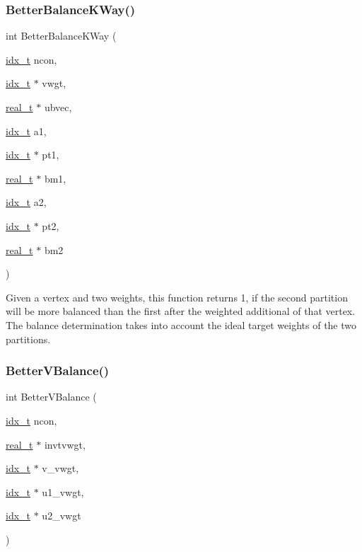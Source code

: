 \subsubsection{\texorpdfstring{Better\+Balance\+K\+Way()}{BetterBalanceKWay()}}
{\footnotesize\ttfamily int Better\+Balance\+K\+Way (\begin{DoxyParamCaption}\item[{\hyperlink{a00876_aaa5262be3e700770163401acb0150f52}{idx\+\_\+t}}]{ncon,  }\item[{\hyperlink{a00876_aaa5262be3e700770163401acb0150f52}{idx\+\_\+t} $\ast$}]{vwgt,  }\item[{\hyperlink{a00876_a1924a4f6907cc3833213aba1f07fcbe9}{real\+\_\+t} $\ast$}]{ubvec,  }\item[{\hyperlink{a00876_aaa5262be3e700770163401acb0150f52}{idx\+\_\+t}}]{a1,  }\item[{\hyperlink{a00876_aaa5262be3e700770163401acb0150f52}{idx\+\_\+t} $\ast$}]{pt1,  }\item[{\hyperlink{a00876_a1924a4f6907cc3833213aba1f07fcbe9}{real\+\_\+t} $\ast$}]{bm1,  }\item[{\hyperlink{a00876_aaa5262be3e700770163401acb0150f52}{idx\+\_\+t}}]{a2,  }\item[{\hyperlink{a00876_aaa5262be3e700770163401acb0150f52}{idx\+\_\+t} $\ast$}]{pt2,  }\item[{\hyperlink{a00876_a1924a4f6907cc3833213aba1f07fcbe9}{real\+\_\+t} $\ast$}]{bm2 }\end{DoxyParamCaption})}

Given a vertex and two weights, this function returns 1, if the second partition will be more balanced than the first after the weighted additional of that vertex. The balance determination takes into account the ideal target weights of the two partitions. \mbox{\label{a00945_aa21eb62301131ba66466b9f4ac4baa37}} 
\subsubsection{\texorpdfstring{Better\+V\+Balance()}{BetterVBalance()}}
{\footnotesize\ttfamily int Better\+V\+Balance (\begin{DoxyParamCaption}\item[{\hyperlink{a00876_aaa5262be3e700770163401acb0150f52}{idx\+\_\+t}}]{ncon,  }\item[{\hyperlink{a00876_a1924a4f6907cc3833213aba1f07fcbe9}{real\+\_\+t} $\ast$}]{invtvwgt,  }\item[{\hyperlink{a00876_aaa5262be3e700770163401acb0150f52}{idx\+\_\+t} $\ast$}]{v\+\_\+vwgt,  }\item[{\hyperlink{a00876_aaa5262be3e700770163401acb0150f52}{idx\+\_\+t} $\ast$}]{u1\+\_\+vwgt,  }\item[{\hyperlink{a00876_aaa5262be3e700770163401acb0150f52}{idx\+\_\+t} $\ast$}]{u2\+\_\+vwgt }\end{DoxyParamCaption})}

